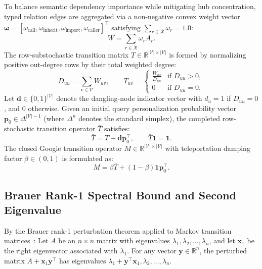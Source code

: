 \documentclass[10pt]{article}
\begin{document}
To balance semantic dependency importance while mitigating hub concentration, typed relation edges are aggregated via a non-negative convex weight vector $\boldsymbol{\omega} = [\omega_{\text{call}}, \omega_{\text{inherit}}, \omega_{\text{import}}, \omega_{\text{caller}}]^\top$ satisfying $\sum_{r \in \mathcal{R}} \omega_r = 1.0$:
\begin{equation}
W = \sum_{r \in \mathcal{R}} \omega_r A_r.
\label{eq:weighted_adjacency_app}
\end{equation}
The row-substochastic transition matrix $T \in \mathbb{R}^{|\mathcal{V}| \times |\mathcal{V}|}$ is formed by normalizing positive out-degree rows by their total weighted degree:
\begin{equation}
D_{uu} = \sum_{v \in \mathcal{V}} W_{uv}, \qquad T_{uv} = \begin{cases} \frac{W_{uv}}{D_{uu}} & \text{if } D_{uu} > 0, \\ 0 & \text{if } D_{uu} = 0. \end{cases}
\label{eq:stochastic_matrix_app}
\end{equation}
Let $\mathbf{d} \in \{0, 1\}^{|\mathcal{V}|}$ denote the dangling-node indicator vector with $d_u = 1$ if $D_{uu} = 0$, and $0$ otherwise. Given an initial query personalization probability vector $\mathbf{p}_0 \in \Delta^{|\mathcal{V}|-1}$ (where $\Delta^{n}$ denotes the standard simplex), the completed row-stochastic transition operator $\bar{T}$ satisfies:
\begin{equation}
\bar{T} = T + \mathbf{d} \mathbf{p}_0^\top, \qquad \bar{T} \mathbf{1} = \mathbf{1}.
\label{eq:completed_stochastic_app}
\end{equation}
The closed Google transition operator $M \in \mathbb{R}^{|\mathcal{V}| \times |\mathcal{V}|}$ with teleportation damping factor $\beta \in (0, 1)$ is formulated as:
\begin{equation}
M = \beta \bar{T} + (1 - \beta) \mathbf{1} \mathbf{p}_0^\top.
\label{eq:google_matrix_app}
\end{equation}

\subsection{Brauer Rank-1 Spectral Bound and Second Eigenvalue}
\label{prop:spectral_gap_proof}
By the Brauer rank-1 perturbation theorem applied to Markov transition matrices~\cite{haveliwala2003second}:
Let $A$ be an $n \times n$ matrix with eigenvalues $\lambda_1, \lambda_2, \dots, \lambda_n$, and let $\mathbf{x}_1$ be the right eigenvector associated with $\lambda_1$. For any vector $\mathbf{y} \in \mathbb{R}^n$, the perturbed matrix $A + \mathbf{x}_1 \mathbf{y}^\top$ has eigenvalues $\lambda_1 + \mathbf{y}^\top \mathbf{x}_1, \lambda_2, \dots, \lambda_n$.
\end{document}
